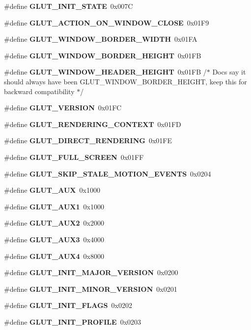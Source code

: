 \begin{DoxyCompactItemize}
\item 
\#define {\bf G\+L\+U\+T\+\_\+\+I\+N\+I\+T\+\_\+\+S\+T\+A\+T\+E}~0x007\+C
\item 
\#define {\bf G\+L\+U\+T\+\_\+\+A\+C\+T\+I\+O\+N\+\_\+\+O\+N\+\_\+\+W\+I\+N\+D\+O\+W\+\_\+\+C\+L\+O\+S\+E}~0x01\+F9
\item 
\#define {\bf G\+L\+U\+T\+\_\+\+W\+I\+N\+D\+O\+W\+\_\+\+B\+O\+R\+D\+E\+R\+\_\+\+W\+I\+D\+T\+H}~0x01\+F\+A
\item 
\#define {\bf G\+L\+U\+T\+\_\+\+W\+I\+N\+D\+O\+W\+\_\+\+B\+O\+R\+D\+E\+R\+\_\+\+H\+E\+I\+G\+H\+T}~0x01\+F\+B
\item 
\#define {\bf G\+L\+U\+T\+\_\+\+W\+I\+N\+D\+O\+W\+\_\+\+H\+E\+A\+D\+E\+R\+\_\+\+H\+E\+I\+G\+H\+T}~0x01\+F\+B  /$\ast$ Docs say it should always have been G\+L\+U\+T\+\_\+\+W\+I\+N\+D\+O\+W\+\_\+\+B\+O\+R\+D\+E\+R\+\_\+\+H\+E\+I\+G\+H\+T, keep this for backward compatibility $\ast$/
\item 
\#define {\bf G\+L\+U\+T\+\_\+\+V\+E\+R\+S\+I\+O\+N}~0x01\+F\+C
\item 
\#define {\bf G\+L\+U\+T\+\_\+\+R\+E\+N\+D\+E\+R\+I\+N\+G\+\_\+\+C\+O\+N\+T\+E\+X\+T}~0x01\+F\+D
\item 
\#define {\bf G\+L\+U\+T\+\_\+\+D\+I\+R\+E\+C\+T\+\_\+\+R\+E\+N\+D\+E\+R\+I\+N\+G}~0x01\+F\+E
\item 
\#define {\bf G\+L\+U\+T\+\_\+\+F\+U\+L\+L\+\_\+\+S\+C\+R\+E\+E\+N}~0x01\+F\+F
\item 
\#define {\bf G\+L\+U\+T\+\_\+\+S\+K\+I\+P\+\_\+\+S\+T\+A\+L\+E\+\_\+\+M\+O\+T\+I\+O\+N\+\_\+\+E\+V\+E\+N\+T\+S}~0x0204
\item 
\#define {\bf G\+L\+U\+T\+\_\+\+A\+U\+X}~0x1000
\item 
\#define {\bf G\+L\+U\+T\+\_\+\+A\+U\+X1}~0x1000
\item 
\#define {\bf G\+L\+U\+T\+\_\+\+A\+U\+X2}~0x2000
\item 
\#define {\bf G\+L\+U\+T\+\_\+\+A\+U\+X3}~0x4000
\item 
\#define {\bf G\+L\+U\+T\+\_\+\+A\+U\+X4}~0x8000
\item 
\#define {\bf G\+L\+U\+T\+\_\+\+I\+N\+I\+T\+\_\+\+M\+A\+J\+O\+R\+\_\+\+V\+E\+R\+S\+I\+O\+N}~0x0200
\item 
\#define {\bf G\+L\+U\+T\+\_\+\+I\+N\+I\+T\+\_\+\+M\+I\+N\+O\+R\+\_\+\+V\+E\+R\+S\+I\+O\+N}~0x0201
\item 
\#define {\bf G\+L\+U\+T\+\_\+\+I\+N\+I\+T\+\_\+\+F\+L\+A\+G\+S}~0x0202
\item 
\#define {\bf G\+L\+U\+T\+\_\+\+I\+N\+I\+T\+\_\+\+P\+R\+O\+F\+I\+L\+E}~0x0203

\end{DoxyCompactItemize}
